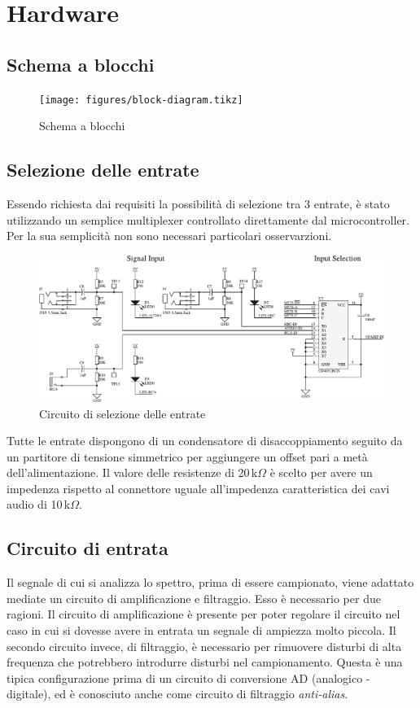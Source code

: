 \chapter{Hardware}
\section{Schema a blocchi}

\begin{figure}[H] \centering \rmfamily
    \texttt{[image: figures/block-diagram.tikz]}
    \caption{Schema a blocchi}
\end{figure}

\section{Selezione delle entrate}
Essendo richiesta dai requisiti la possibilit\`a di selezione tra 3 entrate,
\`e stato utilizzando un semplice multiplexer controllato direttamente dal
microcontroller. Per la sua semplicit\`a non sono necessari particolari
osservarzioni.

\begin{figure}[H] \centering
    \includegraphics[width=.9\linewidth]{figures/circuits/input-selection-v2.pdf}
    \caption{Circuito di selezione delle entrate \label{fig:input-selection-v2}}
\end{figure}

Tutte le entrate dispongono di un condensatore di disaccoppiamento seguito da
un partitore di tensione simmetrico per aggiungere un offset pari a met\`a
dell'alimentazione. Il valore delle resistenze di 20\,k\(\Omega\) \`e scelto
per avere un impedenza rispetto al connettore uguale all'impedenza
caratteristica dei cavi audio di 10\,k\(\Omega\).

\section{Circuito di entrata}
Il segnale di cui si analizza lo spettro, prima di essere campionato, viene
adattato mediate un circuito di amplificazione e filtraggio. Esso \`e
necessario per due ragioni. Il circuito di amplificazione \`e presente per
poter regolare il circuito nel caso in cui si dovesse avere in entrata un
segnale di ampiezza molto piccola. Il secondo circuito invece, di filtraggio,
\`e necessario per rimuovere disturbi di alta frequenza che potrebbero
introdurre disturbi nel campionamento. Questa \`e una tipica configurazione
prima di un circuito di conversione AD (analogico - digitale), ed \`e
conosciuto anche come circuito di filtraggio \emph{anti-alias}.

